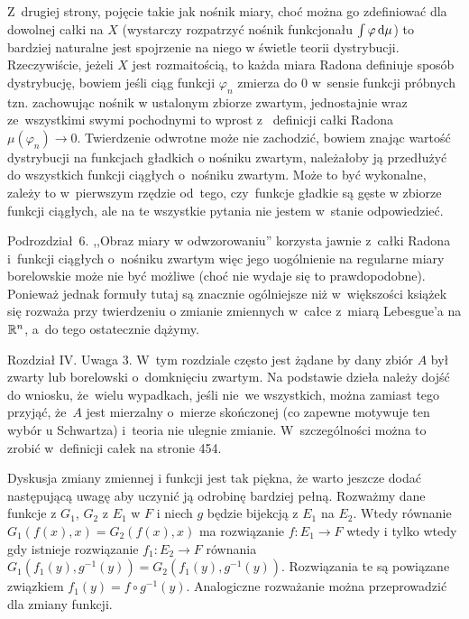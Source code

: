\documentclass[a4paper,11pt]{article}
\newcommand{\ra}{\rightarrow}
\begin{document}
Z~drugiej strony, pojęcie takie jak nośnik miary, choć można go
zdefiniować dla dowolnej całki na $X$ (wystarczy rozpatrzyć nośnik
funkcjonału $\int \varphi \, \mathrm{d} \mu$) to bardziej naturalne jest
spojrzenie na niego w świetle teorii dystrybucji. Rzeczywiście, jeżeli
$X$ jest rozmaitością, to każda miara Radona definiuje sposób
dystrybucję, bowiem jeśli ciąg funkcji $\varphi_{ n }$ zmierza do 0
w~sensie funkcji próbnych tzn. zachowując nośnik w ustalonym zbiorze
zwartym, jednostajnie wraz ze~wszystkimi swymi pochodnymi to wprost z~
definicji całki Radona $\mu( \varphi_{ n } ) \ra 0$. Twierdzenie
odwrotne może nie zachodzić, bowiem znając wartość dystrybucji na
funkcjach gładkich o nośniku zwartym, należałoby ją przedłużyć do
wszystkich funkcji ciągłych o~nośniku zwartym. Może to być wykonalne,
zależy to w~pierwszym rzędzie od~tego, czy~funkcje gładkie są gęste w
zbiorze funkcji ciągłych, ale na te wszystkie pytania nie jestem
w~stanie odpowiedzieć.

\start {} Podrozdział~6. ,,Obraz miary w odwzorowaniu'' korzysta
jawnie z~całki Radona i~funkcji ciągłych o~nośniku zwartym więc jego
uogólnienie na regularne miary borelowskie może nie być możliwe (choć
nie wydaje się to prawdopodobne). Ponieważ jednak formuły tutaj są
znacznie ogólniejsze niż w~większości książek się rozważa przy
twierdzeniu o zmianie zmiennych w~całce z~miarą Lebesgue'a na
$\mathbb{R}^{ n }$, a~do tego ostatecznie dążymy.
  
\start Rozdział IV. Uwaga 3. W~tym rozdziale często jest żądane by
dany zbiór $A$ był zwarty lub borelowski o~domknięciu zwartym. Na
podstawie dzieła \cite{VBMTI} należy dojść do wniosku, że~wielu
wypadkach, jeśli nie~we wszystkich, można zamiast tego przyjąć, że~$A$
jest mierzalny o~mierze skończonej (co zapewne motywuje ten wybór u
Schwartza) i~teoria nie ulegnie zmianie. W~szczególności można to
zrobić w~definicji całek na stronie 454.

\start {} Dyskusja zmiany zmiennej i funkcji jest tak piękna, że
warto jeszcze dodać następującą uwagę aby uczynić ją odrobinę bardziej
pełną. Rozważmy dane funkcje z $G_{ 1 }$, $G_{ 2 }$ z $E_{ 1 }$ w $F$
i niech $g$ będzie bijekcją z $E_{ 1 }$ na $E_{ 2 }$. Wtedy równanie
$G_{ 1 }( f( x ), x ) = G_{ 2 }( f( x ), x )$ ma rozwiązanie
$f : E_{ 1 } \ra F$ wtedy i tylko wtedy gdy istnieje rozwiązanie
$f_{ 1 } : E_{ 2 } \ra F$ równania
$G_{ 1 }( f_{ 1 }( y ), g^{ -1 }( y ) ) = G_{ 2 }( f_{ 1 }( y ), g^{
  -1 }( y ) )$. Rozwiązania te są powiązane związkiem
$f_{ 1 }( y ) = f \circ g^{ -1 }( y )$. Analogiczne rozważanie można
przeprowadzić dla zmiany funkcji.
  
\end{document}
